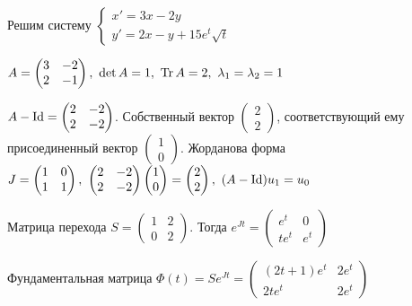 \documentclass[12pt]{article}
\begin{document}
\begin{Example}{}
    Решим систему $\begin{cases}
        x' = 3x - 2y \\
        y' = 2x - y + 15e^t\sqrt{t}
    \end{cases}$

    $A = \begin{pmatrix}
        3 & -2 \\
        2 & -1
    \end{pmatrix},\ \det A = 1,\ \operatorname{Tr} A = 2,\ \lambda_1 = \lambda_2 = 1$

    $A - \operatorname{Id} = \begin{pmatrix}
        2 & - 2 \\
        2 & -2
    \end{pmatrix}$. Собственный вектор $\begin{pmatrix}
        2 \\ 
        2
    \end{pmatrix}$, соответствующий ему присоединенный вектор $\begin{pmatrix}
        1 \\
        0
    \end{pmatrix}$. Жорданова форма $J = \begin{pmatrix}
        1 & 0 \\
        1 & 1
    \end{pmatrix},\ \begin{pmatrix}
        2 & -2 \\
        2 & -2
    \end{pmatrix} \begin{pmatrix}
        1 \\ 
        0
    \end{pmatrix} = \begin{pmatrix}
        2 \\
        2
    \end{pmatrix},\ (A - \operatorname{Id})u_1 = u_0$

    Матрица перехода $S = \begin{pmatrix}
        1 & 2 \\
        0 & 2
    \end{pmatrix}$. Тогда $e^{Jt} = \begin{pmatrix}
        e^t & 0 \\
        te^t & e^t
    \end{pmatrix}$

    Фундаментальная матрица $\Phi(t) = Se^{Jt} = \begin{pmatrix}
        (2t + 1)e^t & 2e^t \\
        2te^t & 2e^t
    \end{pmatrix}$


\end{Example}
\end{document}

